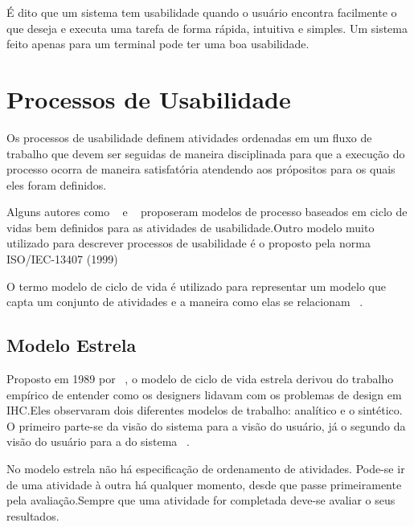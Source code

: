 É dito que um sistema tem usabilidade quando o usuário encontra facilmente o que deseja e executa uma tarefa de forma rápida, intuitiva e simples. Um sistema feito apenas para um terminal pode ter uma boa usabilidade.


\section{Processos de Usabilidade}

	Os processos de usabilidade definem atividades ordenadas em um fluxo de trabalho que devem ser seguidas de maneira disciplinada para que a execução do processo ocorra de maneira satisfatória atendendo aos própositos para os quais eles foram definidos. %

	Alguns autores como ~ e ~ proposeram modelos de processo baseados em ciclo de vidas bem definidos para as atividades de usabilidade.Outro modelo muito utilizado para descrever processos de usabilidade é o proposto pela norma ISO/IEC-13407 (1999)

	O termo modelo de ciclo de vida é utilizado para representar um modelo que capta um conjunto de atividades e a maneira como elas se relacionam ~\cite{preece2005}.

\subsection{Modelo Estrela}

	Proposto em 1989 por ~\citeauthor{hix1993}, o modelo de ciclo de vida estrela derivou do trabalho empírico de entender como os designers lidavam com os problemas de design em IHC.Eles observaram dois diferentes modelos de trabalho: analítico e o sintético. O primeiro parte-se da visão do sistema para a visão do usuário, já o segundo da visão do usuário para a do sistema ~\cite{cybis2010}.

	No modelo estrela não há especificação de ordenamento de atividades. Pode-se ir de uma atividade à outra há qualquer momento, desde que passe primeiramente pela avaliação.Sempre que uma atividade for completada deve-se avaliar o seus resultados.


